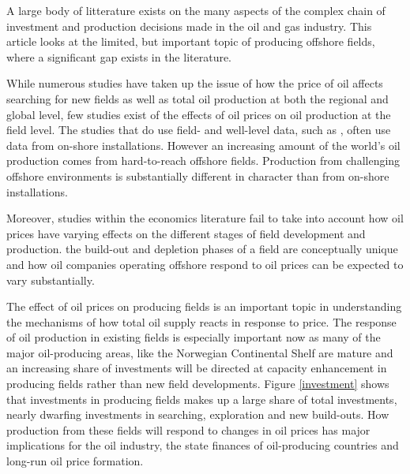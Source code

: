 \documentclass[12pt]{article}
\begin{document}
A large body of litterature exists on the many aspects of the complex chain of investment and production decisions made in the oil and gas industry. This article looks at the limited, but important topic of producing offshore fields, where a significant gap exists in the literature.  

While numerous studies have taken up the issue of how the price of oil affects searching for new fields as well as total oil production at both the regional and global level, few studies exist of the effects of oil prices on oil production at the field level.  The studies that do use field- and well-level data, such as \citet{rao_taxation_2010}, often use data from on-shore installations.  However an increasing amount of the world's oil production comes from hard-to-reach offshore fields.  Production from challenging offshore environments is substantially different in character than from on-shore installations.

Moreover, studies within the economics literature fail to take into account how oil prices have varying effects on the different stages of field development and production.  the build-out and depletion phases of a field are conceptually unique and how oil companies operating offshore respond to oil prices can be expected to vary substantially.

The effect of oil prices on producing fields is an important topic in understanding the mechanisms of how total oil supply reacts in response to price. The response of oil production in existing fields is especially important now as many of the major oil-producing areas, like the Norwegian Continental Shelf are mature and an increasing share of investments will be directed at capacity enhancement in producing fields rather than new field developments. Figure \ref{investment} shows that investments in producing fields makes up a large share of total investments, nearly dwarfing investments in searching, exploration and new build-outs. How production from these fields will respond to changes in oil prices has major implications for the oil industry, the state finances of oil-producing countries and long-run oil price formation.
\end{document}
